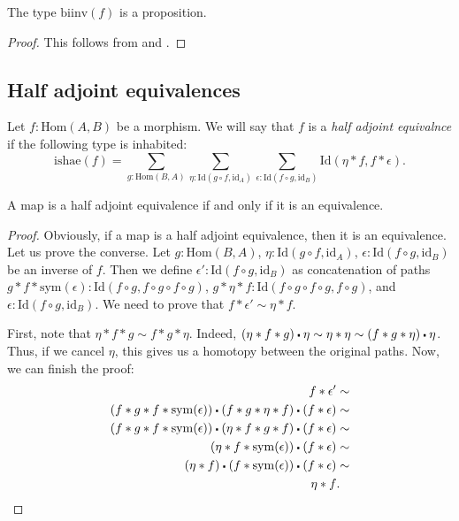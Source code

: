 \documentclass[reqno]{amsart}
\theoremstyle{definition}
\theoremstyle{remark}
\newcommand{\fs}[1]{\mathrm{#1}}
\newcommand{\Hom}{\fs{Hom}}
\newcommand{\Id}{\fs{Id}}
\newcommand{\sym}{\fs{sym}}
\newcommand{\id}{\fs{id}}
\numberwithin{figure}{section}
\newcommand{\ct}{%
  \mathchoice{\mathbin{\raisebox{0.25ex}{$\displaystyle\centerdot$}}}%
             {\mathbin{\raisebox{0.25ex}{$\centerdot$}}}%
             {\mathbin{\raisebox{0.25ex}{$\scriptstyle\,\centerdot\,$}}}%
             {\mathbin{\raisebox{0.25ex}{$\scriptscriptstyle\,\centerdot\,$}}}
}
\begin{document}
\begin{prop}
The type $\fs{biinv}(f)$ is a proposition.
\end{prop}
\begin{proof}
This follows from  and .
\end{proof}

\subsection{Half adjoint equivalences}

Let $f : \Hom(A,B)$ be a morphism.
We will say that $f$ is a \emph{half adjoint equivalnce} if the following type is inhabited:
\[ \fs{ishae}(f) = \sum_{g : \Hom(B,A)} \sum_{\eta : \Id(g \circ f, \id_A)} \sum_{\epsilon : \Id(f \circ g, \id_B)} \Id(\eta * f, f * \epsilon). \]

\begin{prop}
A map is a half adjoint equivalence if and only if it is an equivalence.
\end{prop}
\begin{proof}
Obviously, if a map is a half adjoint equivalence, then it is an equivalence.
Let us prove the converse.
Let $g : \Hom(B,A)$, $\eta : \Id(g \circ f, \id_A)$, $\epsilon : \Id(f \circ g, \id_B)$ be an inverse of $f$.
Then we define $\epsilon' : \Id(f \circ g, \id_B)$ as concatenation of paths
$g * f * \sym(\epsilon) : \Id(f \circ g, f \circ g \circ f \circ g)$, $g * \eta * f : \Id(f \circ g \circ f \circ g, f \circ g)$, and $\epsilon : \Id(f \circ g, \id_B)$.
We need to prove that $f * \epsilon' \sim \eta * f$.

First, note that $\eta * f * g \sim f * g * \eta$.
Indeed, $(\eta * f * g) \ct \eta \sim \eta * \eta \sim (f * g * \eta) \ct \eta$.
Thus, if we cancel $\eta$, this gives us a homotopy between the original paths.
Now, we can finish the proof:
\begin{align*}
f * \epsilon' & \sim \\
(f * g * f * \sym(\epsilon)) \ct (f * g * \eta * f) \ct (f * \epsilon) & \sim \\
(f * g * f * \sym(\epsilon)) \ct (\eta * f * g * f) \ct (f * \epsilon) & \sim \\
(\eta * f * \sym(\epsilon)) \ct (f * \epsilon) & \sim \\
(\eta * f) \ct (f * \sym(\epsilon)) \ct (f * \epsilon) & \sim \\
\eta * f & .
\end{align*}
\end{proof}
\end{document}
